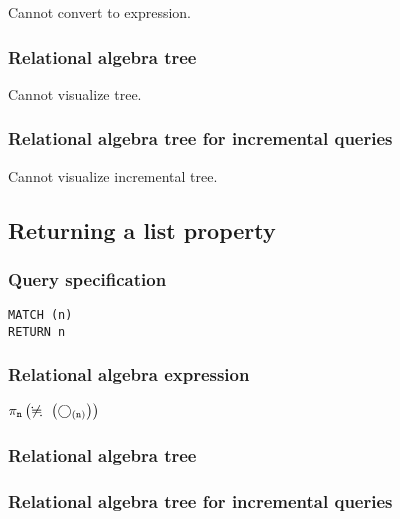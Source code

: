 Cannot convert to expression.

\subsubsection*{Relational algebra tree}

Cannot visualize tree.

\subsubsection*{Relational algebra tree for incremental queries}

Cannot visualize incremental tree.

\subsection{Returning a list property}

\subsubsection*{Query specification}

\begin{lstlisting}
MATCH (n)
RETURN n
\end{lstlisting}

\subsubsection*{Relational algebra expression}

$\projection{\var{n}} \left(\alldifferent{} \left(\getvertices{n}{}\right)\right)$

\subsubsection*{Relational algebra tree}


\subsubsection*{Relational algebra tree for incremental queries}

